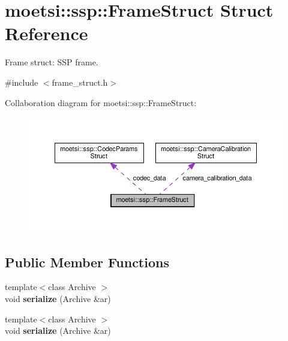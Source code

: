 \hypertarget{structmoetsi_1_1ssp_1_1FrameStruct}{}\section{moetsi\+:\+:ssp\+:\+:Frame\+Struct Struct Reference}
\label{structmoetsi_1_1ssp_1_1FrameStruct}


Frame struct\+: S\+SP frame.  




{\ttfamily \#include $<$frame\+\_\+struct.\+h$>$}



Collaboration diagram for moetsi\+:\+:ssp\+:\+:Frame\+Struct\+:\nopagebreak
\begin{figure}[H]
\begin{center}
\leavevmode
\includegraphics[width=350pt]{structmoetsi_1_1ssp_1_1FrameStruct__coll__graph}
\end{center}
\end{figure}
\subsection*{Public Member Functions}
\begin{DoxyCompactItemize}
\item 
\mbox{\label{structmoetsi_1_1ssp_1_1FrameStruct_af53f4e76978e2a4575b7cd661d30e01f}} 
{\footnotesize template$<$class Archive $>$ }\\void {\bfseries serialize} (Archive \&ar)
\item 
\mbox{\label{structmoetsi_1_1ssp_1_1FrameStruct_af53f4e76978e2a4575b7cd661d30e01f}} 
{\footnotesize template$<$class Archive $>$ }\\void {\bfseries serialize} (Archive \&ar)
\end{DoxyCompactItemize}
